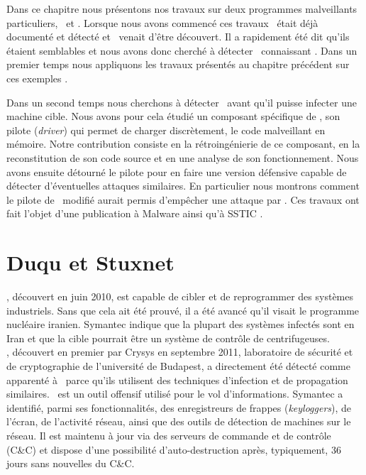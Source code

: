 Dans ce chapitre nous présentons nos travaux sur deux programmes malveillants particuliers, \duqu\ et \stux.
Lorsque nous avons commencé ces travaux \stux\ était déjà documenté et détecté et \duqu\ venait d'être découvert.
Il a rapidement été dit qu'ils étaient semblables et nous avons donc cherché à détecter \duqu\ connaissant \stux.
Dans un premier temps nous appliquons les travaux présentés au chapitre précédent sur ces exemples \cite{REAT12,mal12}.

Dans un second temps nous cherchons à détecter \duqu\ avant qu'il puisse infecter une machine cible.
Nous avons pour cela étudié un composant spécifique de \duqu, son pilote (\emph{driver}) qui permet de charger discrètement, le code malveillant en mémoire.
Notre contribution consiste en la rétroingénierie de ce composant, en la reconstitution de son code source et en une analyse de son fonctionnement.
Nous avons ensuite détourné le pilote pour en faire une version défensive capable de détecter d'éventuelles attaques similaires.
En particulier nous montrons comment le pilote de \duqu\ modifié aurait permis d'empêcher une attaque par \duqu.
Ces travaux ont fait l'objet d'une publication à Malware \cite{mal13} ainsi qu'à SSTIC \cite{sstic13}.


\section{Duqu et Stuxnet}
\stux, découvert en juin 2010, est capable de cibler et de reprogrammer des systèmes industriels.
Sans que cela ait été prouvé, il a été avancé qu'il visait le programme nucléaire iranien. 
Symantec \cite{SymantecStux2011} indique que la plupart des systèmes infectés sont en Iran et que la cible pourrait être un système de contrôle de centrifugeuses.
\\

\duqu, découvert en premier par Crysys \cite{CrysysDuquStuxnet} en septembre 2011, laboratoire de sécurité et de cryptographie de l'université de Budapest, a directement été détecté comme apparenté à \stux\ parce qu'ils utilisent des techniques d'infection et de propagation similaires.
\duqu\ est un outil offensif utilisé pour le vol d'informations. Symantec \cite{SymantecDuqu2011} a identifié, parmi ses fonctionnalités, des enregistreurs de frappes (\emph{keyloggers}), de l'écran, de l'activité réseau, ainsi que des outils de détection de machines sur le réseau.
Il est maintenu à jour via des serveurs de commande et de contrôle (C\&C) et dispose d'une possibilité d'auto-destruction après, typiquement, 36 jours sans nouvelles du C\&C.

